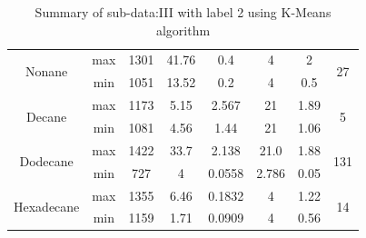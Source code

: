 \documentclass[preprint,12pt]{elsarticle}
\begin{document}
\begin{table}[H]
\begin{tabular}{cccccccc}
					 		\multicolumn{1}{|c|}{\multirow{2}{*}{Nonane}} & \multicolumn{1}{c|}{max} & \multicolumn{1}{c|}{1301} & \multicolumn{1}{c|}{41.76} & \multicolumn{1}{c|}{0.4} & \multicolumn{1}{c|}{4} & \multicolumn{1}{c|}{2} & \multicolumn{1}{c|}{\multirow{2}{*}{27}} \\ \cline{2-7}
					 		\multicolumn{1}{|c|}{} & \multicolumn{1}{c|}{min} & \multicolumn{1}{c|}{1051} & \multicolumn{1}{c|}{13.52} & \multicolumn{1}{c|}{0.2} & \multicolumn{1}{c|}{4} & \multicolumn{1}{c|}{0.5} & \multicolumn{1}{c|}{} \\ \hline
					 		\multicolumn{1}{|c|}{\multirow{2}{*}{Decane}} & \multicolumn{1}{c|}{max} & \multicolumn{1}{c|}{1173} & \multicolumn{1}{c|}{5.15} & \multicolumn{1}{c|}{2.567} & \multicolumn{1}{c|}{21} & \multicolumn{1}{c|}{1.89} & \multicolumn{1}{c|}{\multirow{2}{*}{5}} \\ \cline{2-7}
					 		\multicolumn{1}{|c|}{} & \multicolumn{1}{c|}{min} & \multicolumn{1}{c|}{1081} & \multicolumn{1}{c|}{4.56} & \multicolumn{1}{c|}{1.44} & \multicolumn{1}{c|}{21} & \multicolumn{1}{c|}{1.06} & \multicolumn{1}{c|}{} \\ \hline
					 		\multicolumn{1}{|c|}{\multirow{2}{*}{Dodecane}} & \multicolumn{1}{c|}{max} & \multicolumn{1}{c|}{1422} & \multicolumn{1}{c|}{33.7} & \multicolumn{1}{c|}{2.138} & \multicolumn{1}{c|}{21.0} & \multicolumn{1}{c|}{1.88} & \multicolumn{1}{c|}{\multirow{2}{*}{131}} \\ \cline{2-7}
					 		\multicolumn{1}{|c|}{} & \multicolumn{1}{c|}{min} & \multicolumn{1}{c|}{727} & \multicolumn{1}{c|}{4} & \multicolumn{1}{c|}{0.0558} & \multicolumn{1}{c|}{2.786} & \multicolumn{1}{c|}{0.05} & \multicolumn{1}{c|}{} \\ \hline
					 		\multicolumn{1}{|c|}{\multirow{2}{*}{Hexadecane}} & \multicolumn{1}{c|}{max} & \multicolumn{1}{c|}{1355} & \multicolumn{1}{c|}{6.46} & \multicolumn{1}{c|}{0.1832} & \multicolumn{1}{c|}{4} & \multicolumn{1}{c|}{1.22} & \multicolumn{1}{c|}{\multirow{2}{*}{14}} \\ \cline{2-7}
					 		\multicolumn{1}{|c|}{} & \multicolumn{1}{c|}{min} & \multicolumn{1}{c|}{1159} & \multicolumn{1}{c|}{1.71} & \multicolumn{1}{c|}{0.0909} & \multicolumn{1}{c|}{4} & \multicolumn{1}{c|}{0.56} & \multicolumn{1}{c|}{} \\ \hline
					 	\end{tabular}
					 		\vspace{0.25cm}
					 		\caption{Summary of sub-data:III with label 2 using K-Means algorithm}
					 		\label{table:subdata_3}
					 \end{table}
					
\end{document}
